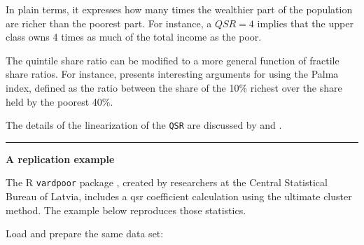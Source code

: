 \documentclass[
]{book}
\begin{document}
In plain terms, it expresses how many times the wealthier part of the population are richer than the poorest part. For instance, a \(QSR = 4\) implies that the upper class owns 4 times as much of the total income as the poor.

The quintile share ratio can be modified to a more general function of fractile share ratios. For instance, \textcite{cobham2015} presents interesting arguments for using the Palma index, defined as the ratio between the share of the 10\% richest over the share held by the poorest 40\%.

The details of the linearization of the \texttt{QSR} are discussed by \textcite{deville1999} and \textcite{osier2009}.

\begin{center}\rule{0.5\linewidth}{0.5pt}\end{center}

\textbf{A replication example}

The R \texttt{vardpoor} package \autocite{vardpoor}, created by researchers at the Central Statistical Bureau of Latvia, includes a qsr coefficient calculation using the ultimate cluster method. The example below reproduces those statistics.

Load and prepare the same data set:
\end{document}
